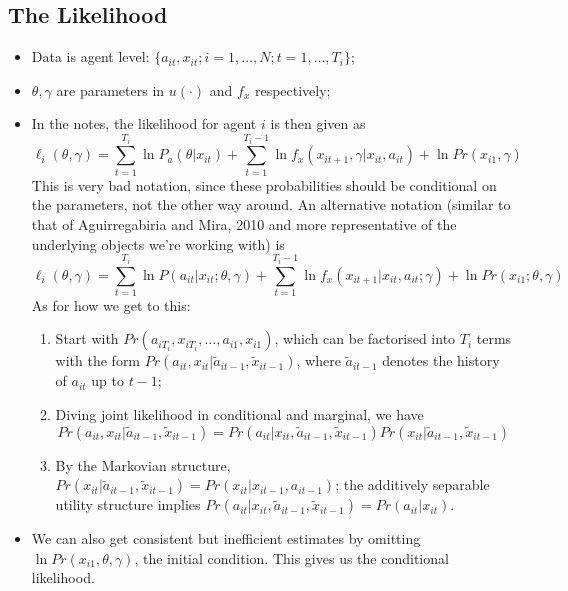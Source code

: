 \documentclass[11pt]{article}
\begin{document}
\subsection*{The Likelihood}
	\begin{itemize}
		\item Data is agent level: $\{a_{it}, x_{it}; i=1,\dots,N; t=1,\dots,T_i\}$;
		\item $\theta, \gamma$ are parameters in $u(\cdot)$ and $f_x$ respectively;
		\item In the notes, the likelihood for agent $i$ is then given as
		\begin{equation}
		\ell_i(\theta, \gamma)= \sum_{t=1}^{T_i}\ln{P_a(\theta|x_{it})} + \sum_{t=1}^{T_i -1} \ln{f_x(x_{it+1}, \gamma |x_{it}, a_{it})} + \ln{Pr(x_{i1},\gamma)}
		\end{equation}
		This is very bad notation, since these probabilities should be conditional on the parameters, not the other way around. An alternative notation (similar to that of Aguirregabiria and Mira, 2010 and more representative of the underlying objects we're working with) is
		\begin{equation}
		\ell_i(\theta, \gamma)= \sum_{t=1}^{T_i}\ln{P(a_{it}|x_{it};\theta, \gamma)} + \sum_{t=1}^{T_i -1} \ln{f_x(x_{it+1} |x_{it}, a_{it}; \gamma)} + \ln{Pr(x_{i1}; \theta,\gamma)}
		\end{equation}
    As for how we get to this:
    \begin{enumerate}
      \item Start with $Pr(a_{iT_i}, x_{iT_i},\dots,a_{i1}, x_{i1})$, which can be factorised into $T_i$ terms with the form $Pr(a_{it},x_{it}|\tilde{a}_{it-1}, \tilde{x}_{it-1})$, where $\tilde{a}_{it-1}$ denotes the history of $a_{it}$ up to $t-1$;
      \item Diving joint likelihood in conditional and marginal, we have
      \begin{equation*}
        Pr(a_{it},x_{it}|\tilde{a}_{it-1}, \tilde{x}_{it-1})=Pr(a_{it}|x_{it},\tilde{a}_{it-1}, \tilde{x}_{it-1})Pr(x_{it}|\tilde{a}_{it-1}, \tilde{x}_{it-1})
      \end{equation*}
      \item By the Markovian structure, $Pr(x_{it}|\tilde{a}_{it-1}, \tilde{x}_{it-1})=Pr(x_{it}|x_{it-1}, a_{it-1})$; the additively separable utility structure implies  $Pr(a_{it}|x_{it},\tilde{a}_{it-1}, \tilde{x}_{it-1})=Pr(a_{it}|x_{it})$.
    \end{enumerate}
		\item We can also get consistent but inefficient estimates by omitting $\ln{Pr(x_{i1},\theta,\gamma)}$, the initial condition. This gives us the conditional likelihood.
	\end{itemize}
\end{document}
